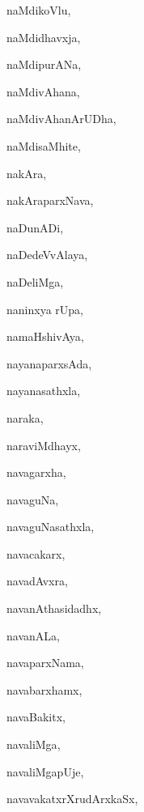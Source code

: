 \begin{multicols}{3}
{\noindent
{naMdikoVlu}, \pageref{naMdikoVlu}

\noindent
{naMdidhavxja}, \pageref{naMdidhavxja}

\noindent
{naMdipurANa}, \pageref{naMdipurANa}

\noindent
{naMdivAhana}, \pageref{naMdivAhana}

\noindent
{naMdivAhanArUDha}, \pageref{naMdivAhanArUDha}

\noindent
{naMdisaMhite}, \pageref{naMdisaMhite}

\noindent
{nakAra}, \pageref{nakAra}

\noindent
{nakAraparxNava}, \pageref{nakAraparxNava}

\noindent
{naDunADi}, \pageref{naDunADi}

\noindent
{naDedeVvAlaya}, \pageref{naDedeVvAlaya}

\noindent
{naDeliMga}, \pageref{naDeliMga}

\noindent
{naninxya rUpa}, \pageref{naninxya rUpa}

\noindent
{namaHshivAya}, \pageref{namaHshivAya}

\noindent
{nayanaparxsAda}, \pageref{nayanaparxsAda}

\noindent
{nayanasathxla}, \pageref{nayanasathxla}

\noindent
{naraka}, \pageref{naraka}

\noindent
{naraviMdhayx}, \pageref{naraviMdhayx}

\noindent
{navagarxha}, \pageref{navagarxha}

\noindent
{navaguNa}, \pageref{navaguNa}

\noindent
{navaguNasathxla}, \pageref{navaguNasathxla}

\noindent
{navacakarx}, \pageref{navacakarx}

\noindent
{navadAvxra}, \pageref{navadAvxra}

\noindent
{navanAthasidadhx}, \pageref{navanAthasidadhx}

\noindent
{navanALa}, \pageref{navanALa}

\noindent
{navaparxNama}, \pageref{navaparxNama}

\noindent
{navabarxhamx}, \pageref{navabarxhamx}

\noindent
{navaBakitx}, \pageref{navaBakitx}

\noindent
{navaliMga}, \pageref{navaliMga}

\noindent
{navaliMgapUje}, \pageref{navaliMgapUje}

\noindent
{navavakatxrXrudArxkaSx}, \pageref{navavakatxrXrudArxkaSx}

}
\end{multicols}
